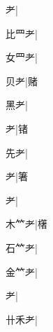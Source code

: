 \begin{multicols}{2}
{{耂}\mktsJzrVerticalBar{}{\cjk{}{\cnsym{}　}{\cnsym{}　}{\cnsym{}　}}|{}\par
{\cjk{}比{\cnxHanaA{}罒}耂}|{}\par
{\cjk{}女{\cnxHanaA{}罒}耂}\mktsJzrVerticalBar{}{\cjk{}{\cnsym{}　}{\cnsym{}　}{\cnsym{}　}}|{}\par
{\cjk{}{\cnsym{}　}贝耂}\mktsJzrVerticalBar{}{\cjk{}{\cnsym{}　}{\cnsym{}　}{\cnsym{}　}}|{\cjk{}赌}\par
{\cjk{}{\cnsym{}　}黑耂}\mktsJzrVerticalBar{}{\cjk{}{\cnsym{}　}{\cnsym{}　}{\cnsym{}　}}|{}\par
{耂}\mktsJzrVerticalBar{}{\cjk{}{\cnsym{}　}{\cnsym{}　}{\cnsym{}　}}|{\cjk{}锗}\par
{先耂}\mktsJzrVerticalBar{}{\cjk{}{\cnsym{}　}{\cnsym{}　}{\cnsym{}　}}|{}\par
{耂}\mktsJzrVerticalBar{}{\cjk{}{\cnsym{}　}{\cnsym{}　}{\cnsym{}　}}|{\cjk{}箸}\par
{耂}\mktsJzrVerticalBar{}{\cjk{}{\cnsym{}　}{\cnsym{}　}{\cnsym{}　}}|{}\par
{\cjk{}木{\cnxb{}𥫗}耂}\mktsJzrVerticalBar{}{\cjk{}{\cnsym{}　}{\cnsym{}　}{\cnsym{}　}}|{\cjk{}櫡}\par
{\cjk{}石{\cnxb{}𥫗}耂}\mktsJzrVerticalBar{}{\cjk{}{\cnsym{}　}{\cnsym{}　}{\cnsym{}　}}|{}\par
{\cjk{}金{\cnxb{}𥫗}耂}\mktsJzrVerticalBar{}{\cjk{}{\cnsym{}　}{\cnsym{}　}{\cnsym{}　}}|{}\par
{耂}\mktsJzrVerticalBar{}{\cjk{}{\cnsym{}　}{\cnsym{}　}{\cnsym{}　}}|{}\par
{\cjk{}卄禾耂}\mktsJzrVerticalBar{}{\cjk{}{\cnsym{}　}{\cnsym{}　}{\cnsym{}　}}|{}\par
}
\end{multicols}
